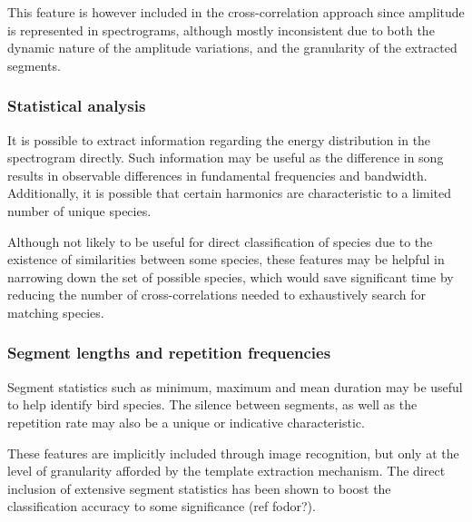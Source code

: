 This feature is however included in the cross-correlation approach since
amplitude is represented in spectrograms, although mostly inconsistent due to
both the dynamic nature of the amplitude variations, and the granularity of the
extracted segments.

\subsubsection{Statistical analysis}
It is possible to extract information regarding the energy distribution in the
spectrogram directly.
Such information may be useful as the difference in song results in observable
differences in fundamental frequencies and bandwidth.
Additionally, it is possible that certain harmonics are characteristic to a
limited number of unique species.

Although not likely to be useful for direct classification of species due to the
existence of similarities between some species, these features may be helpful in
narrowing down the set of possible species, which would save significant time by
reducing the number of cross-correlations needed to exhaustively search for
matching species.

\subsubsection{Segment lengths and repetition frequencies}
Segment statistics such as minimum, maximum and mean duration may be useful to
help identify bird species.
The silence between segments, as well as the repetition rate may also be a
unique or indicative characteristic.

These features are implicitly included through image recognition, but only at
the level of granularity afforded by the template extraction mechanism.
The direct inclusion of extensive segment statistics has been shown to boost
the classification accuracy to some significance (ref fodor?).
